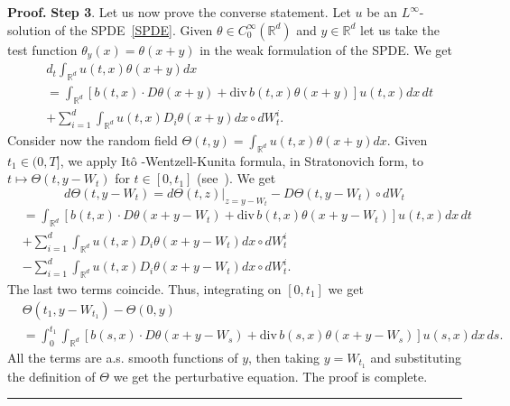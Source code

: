 \documentclass[a4paper,11pt]{article}
\newenvironment{proof}[1][Proof]{\textbf{#1.} }{\ \rule{0.5em}{0.5em}}
\begin{document}
\begin{proof}
\textbf{Step 3}. Let us now prove the converse statement. Let $u$ be an $%
L^{\infty }$-solution of the SPDE~\eqref{SPDE}. Given $\theta \in
C_{0}^{\infty }(\mathbb{R}^{d})$ and $y\in \mathbb{R}^{d}$ let us take the
test function $\theta _{y}\left( x\right) =\theta \left( x+y\right) $ in the
weak formulation of the SPDE. We get
\begin{align*}
& d_t\int_{\mathbb{R}^{d}}u\left( t,x\right) \theta \left( x+y\right) dx \\
& =\int_{\mathbb{R}^{d}}\left[ b\left( t,x\right) \cdot D\theta \left(
x+y\right) +\mathrm{div}\,b\left( t,x\right) \theta \left( x+y\right) \right]
u\left( t,x\right) dx\,dt \\
& +\sum_{i=1}^{d}\int_{\mathbb{R}^{d}}u\left( t,x\right) D_{i}\theta \left(
x+y\right) dx\circ dW_{t}^{i}.
\end{align*}
Consider now the random field $\Theta (t,y)=\int_{\mathbb{R}%
^{d}}u(t,x)\theta (x+y)dx$. Given $t_{1}\in (0,T]$, we apply It\^{o}%
-Wentzell-Kunita formula, in Stratonovich form, to $t\mapsto \Theta \left(
t,y-W_{t}\right) $ for $t\in \left[ 0,t_{1}\right] $ (see~\cite{K}). We get
\begin{equation*}
d\Theta \left( t,y-W_{t}\right) =d\Theta \left( t,z\right)
|_{z=y-W_{t}}-D\Theta \left( t,y-W_{t}\right) \circ dW_{t}
\end{equation*}
\begin{align*}
& =\int_{\mathbb{R}^{d}}\left[ b\left( t,x\right) \cdot D\theta \left(
x+y-W_{t}\right) +\mathrm{div}\,b\left( t,x\right) \theta \left(
x+y-W_{t}\right) \right] u\left( t,x\right) dx\,dt \\
& +\sum_{i=1}^{d}\int_{\mathbb{R}^{d}}u\left( t,x\right) D_{i}\theta \left(
x+y-W_{t}\right) dx\circ dW_{t}^{i} \\
& -\sum_{i=1}^{d}\int_{\mathbb{R}^{d}}u\left( t,x\right) D_{i}\theta \left(
x+y-W_{t}\right) dx\circ dW_{t}^{i}.
\end{align*}
The last two terms coincide. Thus, integrating on $\left[ 0,t_{1}\right] $
we get
\begin{align*}
& \Theta \left( t_{1},y-W_{t_{1}}\right) -\Theta \left( 0,y\right)  \\
& =\int_{0}^{t_{1}}\int_{\mathbb{R}^{d}}\left[ b\left( s,x\right) \cdot
D\theta \left( x+y-W_{s}\right) +\mathrm{div}\,b\left( s,x\right) \theta
\left( x+y-W_{s}\right) \right] u\left( s,x\right) dx\,ds.
\end{align*}
All the terms are a.s. smooth functions of $y$, then taking $y=W_{t_{1}}$
and substituting the definition of $\Theta $ we get the perturbative
equation. The proof is complete.
\end{proof}
\end{document}
